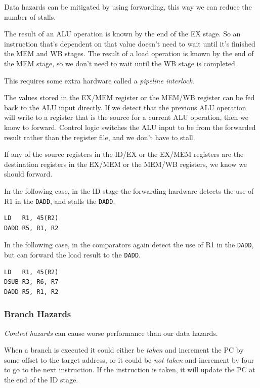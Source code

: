 \documentclass{article}
\begin{document}
Data hazards can be mitigated by using forwarding, this way we can reduce the number of stalls.

The result of an ALU operation is known by the end of the EX stage. So an instruction that's dependent on that value doesn't need to wait until it's finished the MEM and WB stages. The result of a load operation is known by the end of the MEM stage, so we don't need to wait until the WB stage is completed. 

This requires some extra hardware called a \textit{pipeline interlock}. 

The values stored in the EX/MEM register or the MEM/WB register can be fed back to the ALU input directly. If we detect that the previous ALU operation will write to a register that is the source for a current ALU operation, then we know to forward. Control logic switches the ALU input to be from the forwarded result rather than the register file, and we don't have to stall.

If any of the source registers in the ID/EX or the EX/MEM registers are the destination registers in the EX/MEM or the MEM/WB registers, we know we should forward.

In the following case, in the ID stage the forwarding hardware detects the use of R1 in the \texttt{DADD}, and stalls the \texttt{DADD}.

\begin{verbatim}
LD   R1, 45(R2)
DADD R5, R1, R2
\end{verbatim}

In the following case, in the comparators again detect the use of R1 in the \texttt{DADD}, but can forward the load result to the \texttt{DADD}.

\begin{verbatim}
LD   R1, 45(R2)
DSUB R3, R6, R7
DADD R5, R1, R2
\end{verbatim}

\subsubsection{Branch Hazards}

\textit{Control hazards} can cause worse performance than our data hazards. 

When a branch is executed it could either be \textit{taken} and increment the PC by some offset to the target address, or it could be \textit{not taken} and increment by four to go to the next instruction. If the instruction is taken, it will update the PC at the end of the ID stage. 
\end{document}
